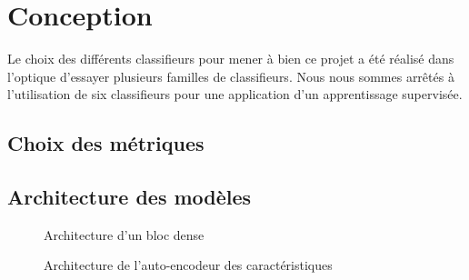 \section{Conception}
Le choix des différents classifieurs pour mener à bien ce projet a été réalisé dans l'optique d'essayer plusieurs familles de classifieurs. Nous nous sommes arrêtés à l'utilisation de six classifieurs pour une application d'un apprentissage supervisée.

\subsection{Choix des métriques}

\subsection{Architecture des modèles}

    \begin{figure}[H]
        \centering
        \caption{Architecture d'un bloc dense}
        \label{fig:architecture_bloc_dense}
    \end{figure}

    
    \begin{figure}[H]
        \centering
        \caption{Architecture de l'auto-encodeur des caractéristiques}
        \label{fig:architecture_autoencoder_caracteristique}
    \end{figure}

    